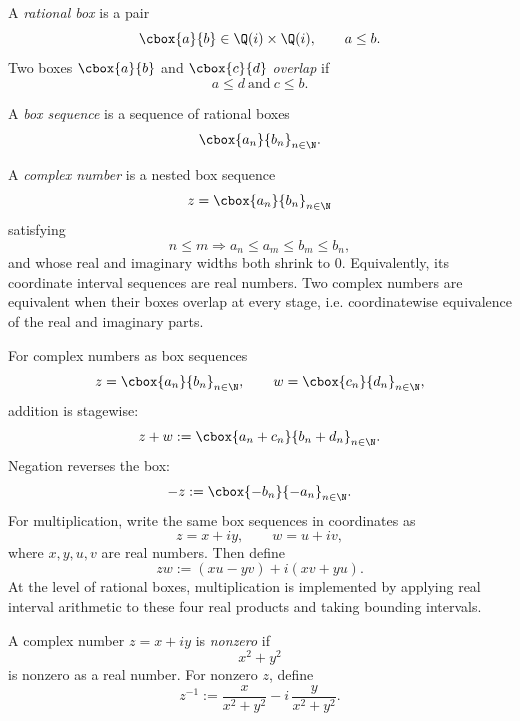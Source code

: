 \begin{definition}\label{def:qbox}
A \emph{rational box} is a pair
\[
  \cbox{a}{b}\in \Q(i)\times\Q(i),
  \qquad a\le b.
\]
Two boxes \(\cbox{a}{b}\) and
\(\cbox{c}{d}\) \emph{overlap} if
\[
  a\le d\ \text{and}\ c\le b.
\]
\end{definition}

\begin{definition}\label{def:box-sequence}
A \emph{box sequence} is a sequence of rational boxes
\[
  \cbox{a_n}{b_n}_{n\in\N}.
\]
\end{definition}

\begin{definition}\label{def:complex-raw}
A \emph{complex number} is a nested box sequence
\[
  z=\cbox{a_n}{b_n}_{n\in\N}
\]
satisfying
\[
  n\le m\Rightarrow a_n\le a_m\le b_m\le b_n,
\]
and whose real and imaginary widths both shrink to \(0\).  Equivalently, its
coordinate interval sequences are real numbers.  Two complex numbers are
equivalent when their boxes overlap at every stage, i.e. coordinatewise
equivalence of the real and imaginary parts.
\end{definition}

\begin{definition}\label{def:complex-arithmetic}
For complex numbers as box sequences
\[
  z=\cbox{a_n}{b_n}_{n\in\N},\qquad
  w=\cbox{c_n}{d_n}_{n\in\N},
\]
addition is stagewise:
\[
  z+w:=\cbox{a_n+c_n}{b_n+d_n}_{n\in\N}.
\]
Negation reverses the box:
\[
  -z:=\cbox{-b_n}{-a_n}_{n\in\N}.
\]
For multiplication, write the same box sequences in coordinates as
\[
  z=x+iy,\qquad w=u+iv,
\]
where \(x,y,u,v\) are real numbers.  Then define
\[
  zw:=(xu-yv)+i(xv+yu).
\]
At the level of rational boxes, multiplication is implemented by applying
real interval arithmetic to these four real products and taking bounding
intervals.
\end{definition}

\begin{definition}\label{def:complex-inverse}
A complex number \(z=x+iy\) is \emph{nonzero} if
\[
  x^2+y^2
\]
is nonzero as a real number.  For nonzero \(z\), define
\[
  z^{-1}
  :=
  \frac{x}{x^2+y^2}
  -
  i\,\frac{y}{x^2+y^2}.
\]
\end{definition}

